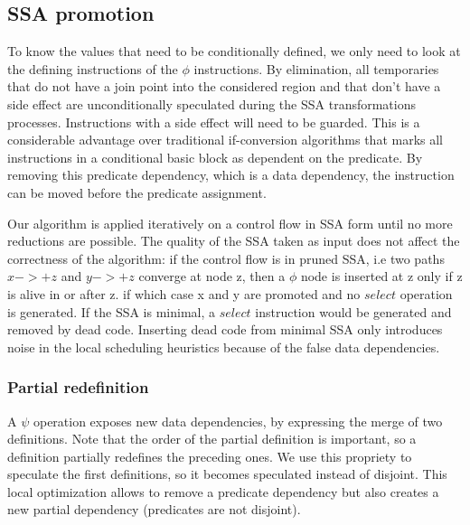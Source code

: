 \subsection{SSA promotion}

To know the values that need to be conditionally defined, we only need to look at the defining instructions of the $\phi$ instructions. By elimination, all temporaries that do not have a join point into the considered region and that don't have a side effect are unconditionally speculated during the SSA transformations processes. Instructions with a side effect will need to be guarded. This is a considerable advantage over traditional if-conversion algorithms that marks all instructions in a conditional basic block as dependent on the predicate. By removing this predicate dependency, which is a data dependency, the instruction can be moved before the predicate assignment.

Our algorithm is applied iteratively on a control flow in SSA form until no more reductions are possible. The quality of the SSA taken as input does not affect the correctness of the algorithm: if the control flow is in pruned SSA, i.e two paths $x->+z$ and $y->+z$ converge at node z, then a $\phi$ node is inserted at z only if z is alive in or after z. if which case x and y are promoted and no $select$ operation is generated. If the SSA is minimal, a $select$ instruction would be generated and removed by dead code. Inserting dead code from minimal SSA only introduces noise in the local scheduling heuristics because of the false data dependencies.

\subsubsection{Partial redefinition}

A $\psi$ operation exposes new data dependencies, by expressing the merge of two definitions. Note that the order of the partial definition is important, so a definition partially redefines the preceding ones. We use this propriety to speculate the first definitions, so it becomes speculated instead of disjoint. This local optimization allows to remove a predicate dependency but also creates a new partial dependency (predicates are not disjoint). 

